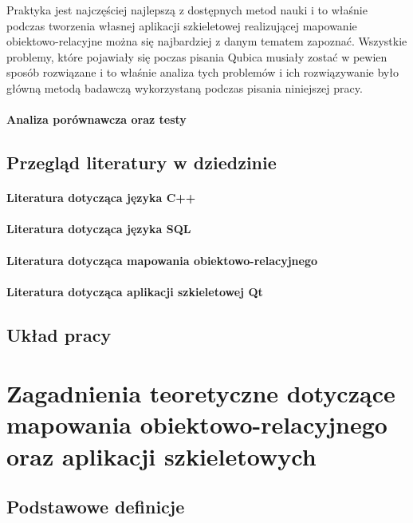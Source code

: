 \documentclass[12pt]{report}
\begin{document}
Praktyka jest najczęściej najlepszą z dostępnych metod nauki i to właśnie podczas tworzenia własnej aplikacji szkieletowej realizującej mapowanie obiektowo-relacyjne można
się najbardziej z danym tematem zapoznać. Wszystkie problemy, które pojawiały się poczas pisania Qubica musiały zostać w pewien sposób rozwiązane i to właśnie analiza
tych problemów i ich rozwiązywanie było główną metodą badawczą wykorzystaną podczas pisania niniejszej pracy.

\subsubsection{Analiza porównawcza oraz testy}

\section{Przegląd literatury w dziedzinie}

\subsubsection{Literatura dotycząca języka C++}

\subsubsection{Literatura dotycząca języka SQL}

\subsubsection{Literatura dotycząca mapowania obiektowo-relacyjnego}

\subsubsection{Literatura dotycząca aplikacji szkieletowej Qt}

\section{Układ pracy} %

\chapter{Zagadnienia teoretyczne dotyczące mapowania obiektowo-relacyjnego oraz aplikacji szkieletowych} \label{teoria}

\section{Podstawowe definicje} %
\end{document}
